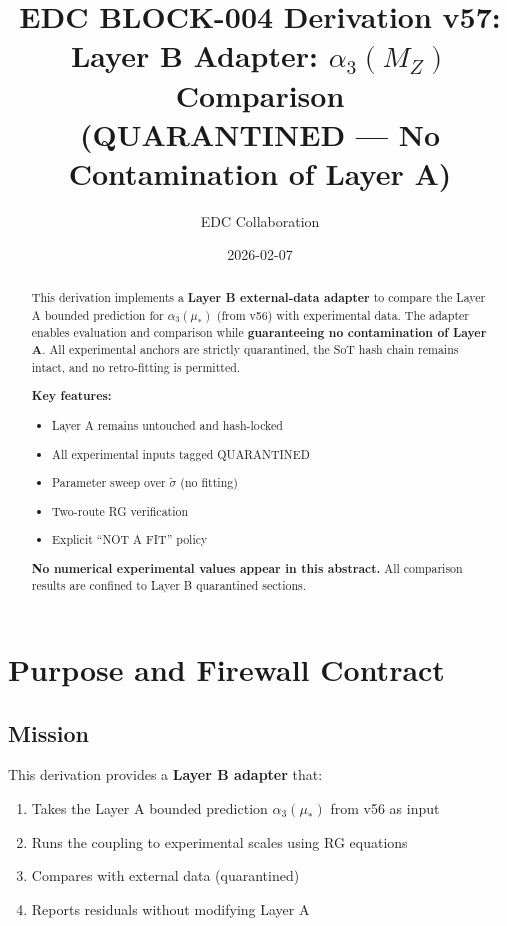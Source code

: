 \documentclass[11pt,a4paper]{article}
\title{%
  \textbf{EDC BLOCK-004 Derivation v57:}\\[0.5em]
  \Large Layer B Adapter: $\alpha_3(M_Z)$ Comparison\\[0.3em]
  \large (QUARANTINED --- No Contamination of Layer A)
}
\author{EDC Collaboration}
\date{2026-02-07}
\theoremstyle{definition}
\begin{document}
\maketitle

\begin{abstract}
This derivation implements a \textbf{Layer B external-data adapter} to compare
the Layer A bounded prediction for $\alpha_3(\mu_*)$ (from v56) with experimental
data. The adapter enables evaluation and comparison while \textbf{guaranteeing
no contamination of Layer A}. All experimental anchors are strictly quarantined,
the SoT hash chain remains intact, and no retro-fitting is permitted.

\textbf{Key features:}
\begin{itemize}
  \item Layer A remains untouched and hash-locked
  \item All experimental inputs tagged QUARANTINED
  \item Parameter sweep over $\tilde{\sigma}$ (no fitting)
  \item Two-route RG verification
  \item Explicit ``NOT A FIT'' policy
\end{itemize}

\textbf{No numerical experimental values appear in this abstract.}
All comparison results are confined to Layer B quarantined sections.
\end{abstract}

\tableofcontents
\newpage

\section{Purpose and Firewall Contract}
\label{sec:purpose}

\subsection{Mission}
\label{subsec:mission}

This derivation provides a \textbf{Layer B adapter} that:
\begin{enumerate}
  \item Takes the Layer A bounded prediction $\alpha_3(\mu_*)$ from v56 as input
  \item Runs the coupling to experimental scales using RG equations
  \item Compares with external data (quarantined)
  \item Reports residuals without modifying Layer A
\end{enumerate}
\end{document}
